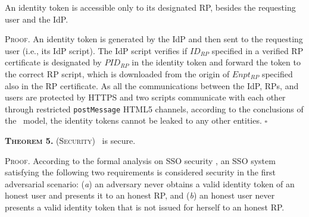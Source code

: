 

\vspace{2mm}
 { An identity token is accessible only to its designated RP, besides the requesting user and the IdP.}

\vspace{0.85mm}
\noindent\textsc{Proof.}
An identity token is generated by the IdP and then sent to the requesting user (i.e., its IdP script).
The IdP script verifies if $ID_{RP}$ specified in a verified RP certificate is designated by $PID_{RP}$ in the identity token and forward the token to the correct RP script, which is downloaded from the origin of $Enpt_{RP}$ specified also in the RP certificate. %
As all the communications between the IdP, RPs, and users are protected by HTTPS and two scripts communicate with each other through restricted \verb+postMessage+ HTML5 channels, according to the conclusions of the \dyu\ model, the identity tokens cannot be leaked to any other entities. \hfill $\square$


\vspace{2mm}
\noindent\textsc{\textbf{Theorem 5.} (Security)} {\usso\ is secure.}

\vspace{0.85mm}
\noindent\textsc{Proof.}
According to the formal analysis on SSO security \cite{SPRESSO, FettKS14},
    an SSO system satisfying the following two requirements is considered security in the first adversarial scenario: (\emph{a}) an adversary never obtains a valid identity token of an honest user and presents it to an honest RP, and (\emph{b}) an honest user never presents a valid identity token that is not issued for herself to an honest RP.


